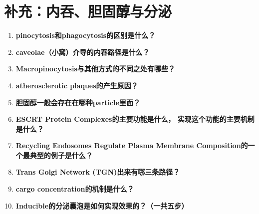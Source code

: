 \documentclass[12pt,fontset=none]{ctexart}
\begin{document}
\section*{补充：内吞、胆固醇与分泌}
\begin{enumerate}
\item \textbf{pinocytosis和phagocytosis的区别是什么？}

\item \textbf{caveolae（小窝）介导的内吞路径是什么？}

\item \textbf{Macropinocytosis与其他方式的不同之处有哪些？}

\item \textbf{atherosclerotic plaques的产生原因？}

\item \textbf{胆固醇一般会存在在哪种particle里面？}

\item \textbf{ESCRT Protein Complexes的主要功能是什么， 实现这个功能的主要机制是什么？}

\item \textbf{Recycling Endosomes Regulate Plasma Membrane Composition的一个最典型的例子是什么？}

\item \textbf{Trans Golgi Network (TGN)出来有哪三条路径？}

\item \textbf{cargo concentration的机制是什么？}

\item \textbf{Inducible的分泌囊泡是如何实现效果的？（一共五步）}

\end{enumerate}



\end{document}
